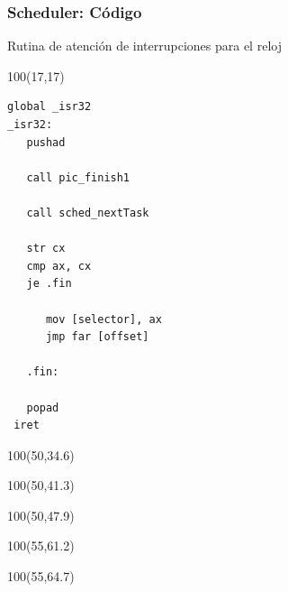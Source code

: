 \documentclass[aspectratio=169]{beamer}
\begin{document}
\begin{frame}[fragile,t]
\frametitle{Scheduler: Código}
Rutina de atención de interrupciones para el reloj
\begin{textblock}{100}(17,17) 
\scriptsize
\begin{verbatim}
global _isr32
_isr32:
   pushad

   call pic_finish1

   call sched_nextTask

   str cx
   cmp ax, cx
   je .fin

      mov [selector], ax
      jmp far [offset]

   .fin:

   popad
 iret
\end{verbatim}
\end{textblock}
\begin{textblock}{100}(50,34.6) \scriptsize {} \end{textblock}
\begin{textblock}{100}(50,41.3) \scriptsize {} \end{textblock}
\begin{textblock}{100}(50,47.9) \scriptsize {} \end{textblock}
\begin{textblock}{100}(55,61.2) \scriptsize {} \end{textblock}
\begin{textblock}{100}(55,64.7) \scriptsize {} \end{textblock}
\end{frame}
\end{document}
